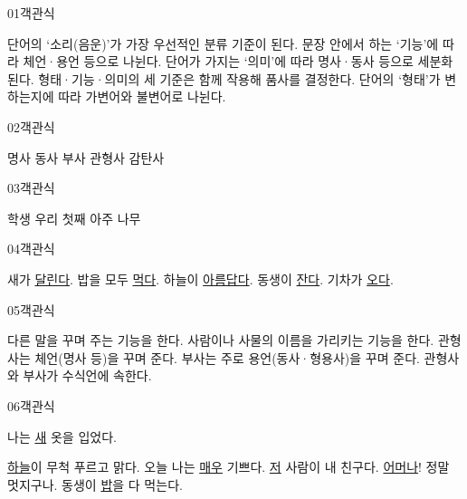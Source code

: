 \documentclass[fs85,seriesRus]{korfarm-base}
\begin{document}

\par\medskip
\kfBeginMC
\begin{kfQBlock}{01}{객관식}
\begin{kfChoices}
\kfChoice 단어의 ‘소리(음운)’가 가장 우선적인 분류 기준이 된다.
\kfChoice 문장 안에서 하는 ‘기능’에 따라 체언·용언 등으로 나뉜다.
\kfChoice 단어가 가지는 ‘의미’에 따라 명사·동사 등으로 세분화된다.
\kfChoice 형태·기능·의미의 세 기준은 함께 작용해 품사를 결정한다.
\kfChoice 단어의 ‘형태’가 변하는지에 따라 가변어와 불변어로 나뉜다.
\end{kfChoices}
\end{kfQBlock}
\begin{kfQBlock}{02}{객관식}
\begin{kfChoices}
\kfChoice 명사
\kfChoice 동사
\kfChoice 부사
\kfChoice 관형사
\kfChoice 감탄사
\end{kfChoices}
\end{kfQBlock}
\begin{kfQBlock}{03}{객관식}
\begin{kfChoices}
\kfChoice 학생
\kfChoice 우리
\kfChoice 첫째
\kfChoice 아주
\kfChoice 나무
\end{kfChoices}
\end{kfQBlock}
\begin{kfQBlock}{04}{객관식}
\begin{kfChoices}
\kfChoice 새가 \uline{달린다}.
\kfChoice 밥을 모두 \uline{먹다}.
\kfChoice 하늘이 \uline{아름답다}.
\kfChoice 동생이 \uline{잔다}.
\kfChoice 기차가 \uline{오다}.
\end{kfChoices}
\end{kfQBlock}
\begin{kfQBlock}{05}{객관식}
\begin{kfChoices}
\kfChoice 다른 말을 꾸며 주는 기능을 한다.
\kfChoice 사람이나 사물의 이름을 가리키는 기능을 한다.
\kfChoice 관형사는 체언(명사 등)을 꾸며 준다.
\kfChoice 부사는 주로 용언(동사·형용사)을 꾸며 준다.
\kfChoice 관형사와 부사가 수식언에 속한다.
\end{kfChoices}
\end{kfQBlock}
\begin{kfQBlock}{06}{객관식}
\begin{kfEvidence}나는 \uline{새} 옷을 입었다.\end{kfEvidence}
\begin{kfChoices}
\kfChoice \uline{하늘}이 무척 푸르고 맑다.
\kfChoice 오늘 나는 \uline{매우} 기쁘다.
\kfChoice \uline{저} 사람이 내 친구다.
\kfChoice \uline{어머나}! 정말 멋지구나.
\kfChoice 동생이 \uline{밥}을 다 먹는다.
\end{kfChoices}
\end{kfQBlock}
\end{document}
